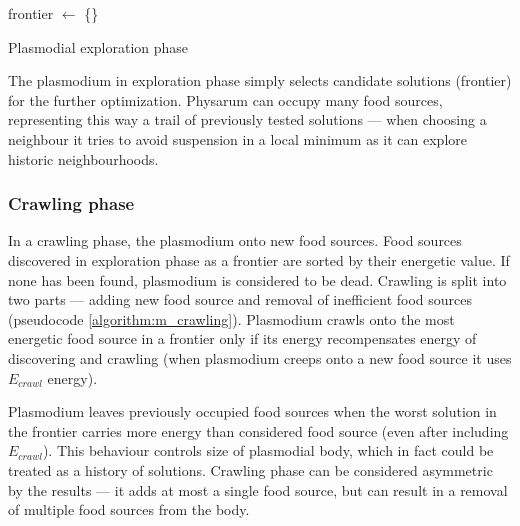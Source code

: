 \documentclass[english,a4paper,twoside]{ppfcmthesis}
\begin{document}
\begin{algorithm}
  \BlankLine

  frontier $\leftarrow$ \{\}\;

  \;

  \caption{Plasmodial exploration phase}
  \label{algorithm:m_exploration}
\end{algorithm}

The plasmodium in exploration phase simply selects candidate solutions (frontier) for the further optimization. Physarum can occupy many food sources, representing this way a trail of previously tested solutions --- when choosing a neighbour it tries to avoid suspension in a local minimum as it can explore historic neighbourhoods.

\subsubsection{Crawling phase}

In a crawling phase, the plasmodium onto new food sources. Food sources discovered in exploration phase as a frontier are sorted by their energetic value. If none has been found, plasmodium is considered to be dead. Crawling is split into two parts --- adding new food source and removal of inefficient food sources (pseudocode \ref{algorithm:m_crawling}). Plasmodium crawls onto the most energetic food source in a frontier only if its energy recompensates energy of discovering and crawling (when plasmodium creeps onto a new food source it uses $E_{crawl}$ energy). 

Plasmodium leaves previously occupied food sources when the worst solution in the frontier carries more energy than considered food source (even after including $E_{crawl}$). This behaviour controls size of plasmodial body, which in fact could be treated as a history of solutions. Crawling phase can be considered asymmetric by the results --- it adds at most a single food source, but can result in a removal of multiple food sources from the body.
\end{document}
